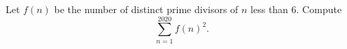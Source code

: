 Let $f(n)$ be the number of distinct prime divisors of $n$ less than $6$. Compute \[\sum_{n=1}^{2020} f(n)^2.\]
